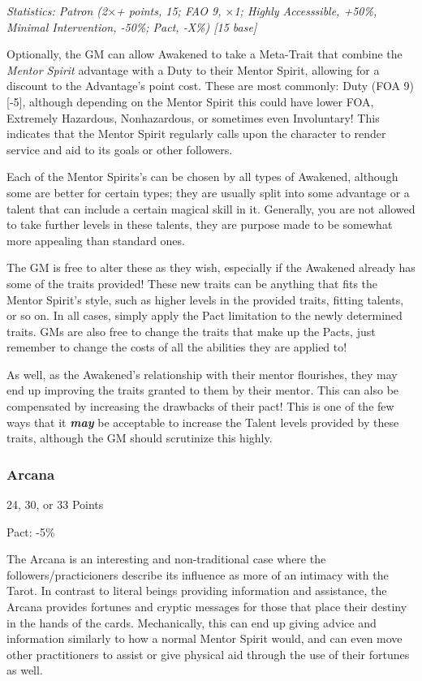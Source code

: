 \begin{multicols}{3}
	\textit{\textcolor{OliveGreen}{Statistics: Patron (2$\times$+ points, 15; FAO 9, $\times$1; Highly Accesssible, +50\%, Minimal Intervention, -50\%; Pact, -X\%) [15 base]}}
	
	Optionally, the GM can allow Awakened to take a Meta-Trait that combine the \textit{Mentor Spirit} advantage with a Duty to their Mentor Spirit, allowing for a discount to the Advantage's point cost. These are most commonly: Duty (FOA 9) [-5], although depending on the Mentor Spirit this could have lower FOA, Extremely Hazardous, Nonhazardous, or sometimes even Involuntary! This indicates that the Mentor Spirit regularly calls upon the character to render service and aid to its goals or other followers.
	
	Each of the Mentor Spirits's can be chosen by all types of Awakened, although some are better for certain types; they are usually split into some advantage or a talent that can include a certain magical skill in it. Generally, you are not allowed to take further levels in these talents, they are purpose made to be somewhat more appealing than standard ones. 
	
	The GM is free to alter these as they wish, especially if the Awakened already has some of the traits provided! These new traits can be anything that fits the Mentor Spirit's style, such as higher levels in the provided traits, fitting talents, or so on. In all cases, simply apply the Pact limitation to the newly determined traits. GMs are also free to change the traits that make up the Pacts, just remember to change the costs of all the abilities they are applied to!
	
	As well, as the Awakened's relationship with their mentor flourishes, they may end up improving the traits granted to them by their mentor. This can also be compensated by increasing the drawbacks of their pact! This is one of the few ways that it \textit{\textbf{may}} be acceptable to increase the Talent levels provided by these traits, although the GM should scrutinize this highly.
	
	\subsubsection{Arcana}
	\begin{flushright}
		24, 30, or 33 Points
	\end{flushright}
	Pact: -5\%
	
	The Arcana is an interesting and non-traditional case where the followers/practicioners describe its influence as more of an intimacy with the Tarot. In contrast to literal beings providing information and assistance, the Arcana provides fortunes and cryptic messages for those that place their destiny in the hands of the cards. Mechanically, this can end up giving advice and information similarly to how a normal Mentor Spirit would, and can even move other practitioners to assist or give physical aid through the use of their fortunes as well.
	

\end{multicols}
